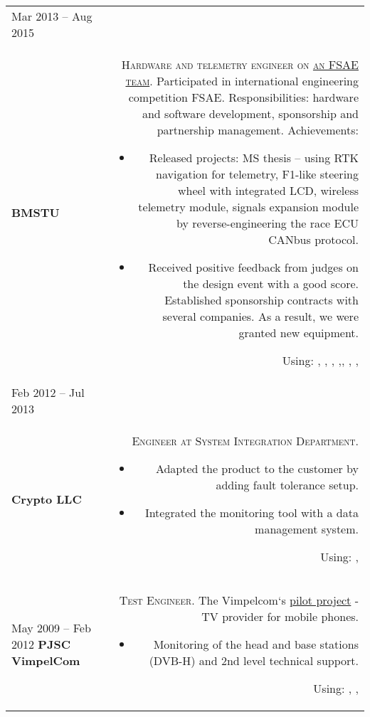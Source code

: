 \begin{tabular}{@{}L!{\VRule}R}
    Mar 2013 -- Aug 2015                                                                                                     \\ {\bf BMSTU \\ } &
    {\textsc{Hardware and telemetry engineer on \href{https://baumanracing.ru/en/}{an FSAE team}.}}
    Participated in international engineering competition FSAE.
    Responsibilities: hardware and software development, sponsorship and partnership management.
    Achievements:
    \begin{itemize}
        \item Released projects: MS thesis -- using RTK navigation for telemetry, F1-like steering wheel with integrated LCD, wireless telemetry module, signals expansion module by reverse-engineering the race ECU CANbus protocol.
        \item Received positive feedback from judges on the design event with a good score. Established sponsorship contracts with several companies. As a result, we were granted new equipment.
    \end{itemize}
    Using: , , , ,, , ,  \\
    Feb 2012 -- Jul 2013                                                                                                     \\ {\bf Crypto LLC \\ } &
    {\textsc{Engineer at System Integration Department.}}
    \begin{itemize}
        \item Adapted the product to the customer by adding fault tolerance setup.
        \item Integrated the monitoring tool with a data management system.
    \end{itemize}
    Using: ,                                                                   \\
    May 2009 -- Feb 2012 {\bf PJSC VimpelCom} &
    {\textsc{Test Engineer.}} The Vimpelcom`s \href{https://www.dvb.org/news/russia-to-launch-dvb-h-services}{pilot project} - TV provider for mobile phones.
    \begin{itemize}
        \item Monitoring of the head and base stations (DVB-H) and 2nd level technical support.
    \end{itemize}
    Using: , , 
\end{tabular}
